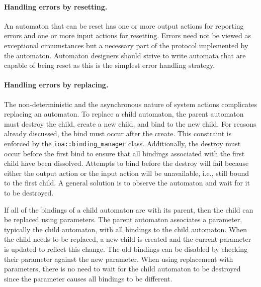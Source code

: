 \paragraph{Handling errors by resetting.}
An automaton that can be reset has one or more output actions for reporting errors and one or more input actions for resetting.
Errors need not be viewed as exceptional circumstances but a necessary part of the protocol implemented by the automaton.
Automaton designers should strive to write automata that are capable of being reset as this is the simplest error handling strategy.

\paragraph{Handling errors by replacing.}
The non-deterministic and the asynchronous nature of system actions complicates replacing an automaton.
To replace a child automaton, the parent automaton must destroy the child, create a new child, and bind to the new child.
For reasons already discussed, the bind must occur after the create.
This constraint is enforced by the \verb+ioa::binding_manager+ class.
Additionally, the destroy must occur before the first bind to ensure that all bindings associated with the first child have been dissolved.
Attempts to bind before the destroy will fail because either the output action or the input action will be unavailable, i.e., still bound to the first child.
A general solution is to observe the automaton and wait for it to be destroyed.

If all of the bindings of a child automaton are with its parent, then the child can be replaced using parameters.
The parent automaton associates a parameter, typically the child automaton, with all bindings to the child automaton.
When the child needs to be replaced, a new child is created and the current parameter is updated to reflect this change.
The old bindings can be disabled by checking their parameter against the new parameter.
When using replacement with parameters, there is no need to wait for the child automaton to be destroyed since the parameter causes all bindings to be different.



